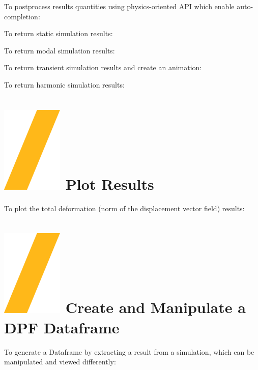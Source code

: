\documentclass[9pt,landscape]{article}
\begin{document}
\begin{multicols}{3}
To postprocess results quantities using physics-oriented API which enable auto-completion:

\vspace{2mm} %

To return static simulation results:


To return modal simulation results:


To return transient simulation results and create an animation:


To return harmonic simulation results:


\section{\includegraphics[height=\fontcharht\font`\S]{slash.png} Plot Results}

To plot the total deformation (norm of the displacement vector field) results:



\section{\includegraphics[height=\fontcharht\font`\S]{slash.png} Create and Manipulate a DPF Dataframe}
To generate a Dataframe by extracting a result from a simulation, which can be manipulated and viewed differently:


\end{multicols}
\end{document}
